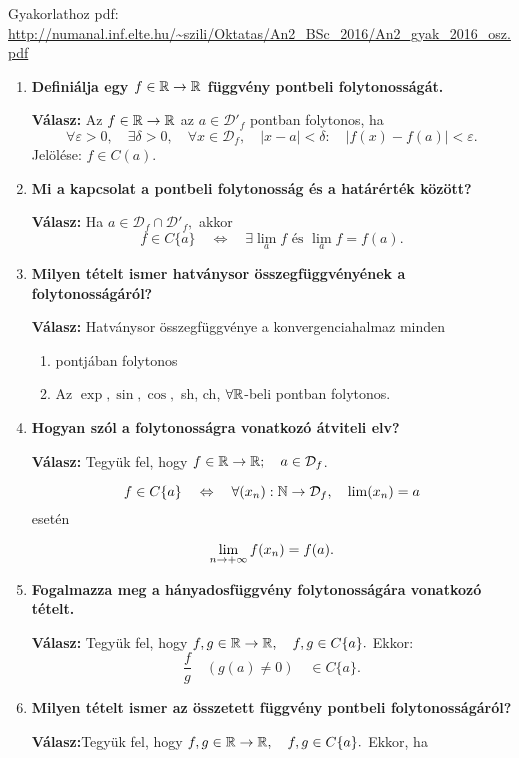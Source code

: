 \documentclass[a4paper,11.5pt]{article}
\begin{document}
	Gyakorlathoz pdf: \url{http://numanal.inf.elte.hu/~szili/Oktatas/An2_BSc_2016/An2_gyak_2016_osz.pdf}
	\begin{enumerate}
		\item \textbf{Definiálja egy  $f\in\mathbb{R}\to\mathbb{R}$ függvény pontbeli folytonosságát.}
		
		\textbf{Válasz:} Az $f\in\mathbb{R}\to\mathbb{R}$ az $a\in\mathcal{D'}_f$ pontban folytonos, ha 
		\[ \forall \varepsilon>0, \quad \exists \delta>0, \quad \forall x\in\mathcal{D}_f,\quad |x-a|<\delta:\quad |f(x)-f(a)|<\varepsilon. \]
		Jelölése: $f\in C(a)$.
		
		\item \textbf{Mi a kapcsolat a pontbeli folytonosság és a határérték között?}
		
		\textbf{Válasz:} Ha $a\in \mathcal{D}_f\cap\mathcal{D}'_f,$ akkor 
		\[f\in C\{a\} \quad \Leftrightarrow\quad  \exists \lim_af \text{ és }\lim_af=f(a).  \]
		
		\item \textbf{Milyen tételt ismer hatványsor összegfüggvényének a folytonosságáról?}
		
		\textbf{Válasz:}
			Hatványsor összegfüggvénye a konvergenciahalmaz minden
			\begin{enumerate}
				\item pontjában folytonos
				\item Az $\exp, \sin, \cos,$ sh, ch, $\forall\mathbb{R}$-beli pontban folytonos.
			\end{enumerate}
		
		\item \textbf{Hogyan szól a folytonosságra vonatkozó átviteli elv?}
		
		\textbf{Válasz:} Tegyük fel, hogy $f\in\mathbb{R}\to\mathbb{R};\quad  a\in\mathcal{D}_f$.
		
		\[ f\in C\{a\}\quad \Leftrightarrow\quad  \forall(x_n):  \mathbb{N}\to\mathcal{D}_f,\quad  \lim(x_n) = a \]
		esetén
		
		\[ \displaystyle\lim_{n\to +\infty} f(x_n) = f(a). \]
		
		\item \textbf{Fogalmazza meg a hányadosfüggvény folytonosságára vonatkozó tételt.}
		
		\textbf{Válasz:} Tegyük fel, hogy $f,g\in\mathbb{R}\to\mathbb{R}, \quad f,g\in C\{a\}.$ Ekkor: 
		\[\frac{f}{g} \quad (g(a)\not=0) \quad \in C\{a\}.\]
		
		\item \textbf{Milyen tételt ismer az összetett függvény pontbeli folytonosságáról?}
		
		\textbf{Válasz:}Tegyük fel, hogy $f,g\in\mathbb{R}\to\mathbb{R}, \quad f,g\in C\{a\}.$ Ekkor, ha 
		

\end{enumerate}
\end{document}
